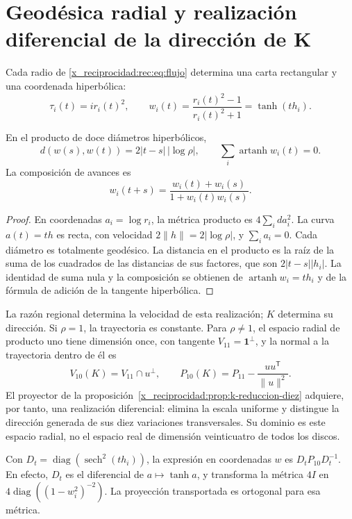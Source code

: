 \section{Geodésica radial y realización diferencial de la dirección de K}

Cada radio de \eqref{x_reciprocidad:rec:eq:flujo} determina una carta rectangular y una coordenada hiperbólica:
\[
 \tau_i(t)=ir_i(t)^2,\qquad
 w_i(t)=\frac{r_i(t)^2-1}{r_i(t)^2+1}=\tanh(th_i).
\]

\begin{theorem}
\label{x_reciprocidad:rec:thm:geodesica}
En el producto de doce diámetros hiperbólicos,
\begin{equation}
 d(w(s),w(t))=2|t-s|\,|\log\rho|,\qquad
 \sum_i\operatorname{artanh}w_i(t)=0.
 \label{x_reciprocidad:rec:eq:geodesica}
\end{equation}
La composición de avances es
\[
 w_i(t+s)=\frac{w_i(t)+w_i(s)}{1+w_i(t)w_i(s)}.
\]
\end{theorem}
\begin{proof}
En coordenadas \(a_i=\log r_i\), la métrica producto es \(4\sum_i da_i^2\). La curva \(a(t)=th\) es recta, con velocidad \(2\|h\|=2|\log\rho|\), y \(\sum_i a_i=0\). Cada diámetro es totalmente geodésico. La distancia en el producto es la raíz de la suma de los cuadrados de las distancias de sus factores, que son \(2|t-s||h_i|\). La identidad de suma nula y la composición se obtienen de \(\operatorname{artanh}w_i=th_i\) y de la fórmula de adición de la tangente hiperbólica.
\end{proof}

La razón regional determina la velocidad de esta realización; \(K\) determina su dirección. Si \(\rho=1\), la trayectoria es constante. Para \(\rho\ne1\), el espacio radial de producto uno tiene dimensión once, con tangente \(V_{11}=\mathbf1^\perp\), y la normal a la trayectoria dentro de él es
\[
 V_{10}(K)=V_{11}\cap u^\perp,\qquad
 P_{10}(K)=P_{11}-\frac{uu^{\mathsf T}}{\|u\|^2}.
\]
El proyector de la proposición~\ref{x_reciprocidad:prop:k-reduccion-diez} adquiere, por tanto, una realización diferencial: elimina la escala uniforme y distingue la dirección generada de sus diez variaciones transversales. Su dominio es este espacio radial, no el espacio real de dimensión veinticuatro de todos los discos.

Con \(D_t=\operatorname{diag}(\operatorname{sech}^2(th_i))\), la expresión en coordenadas \(w\) es \(D_tP_{10}D_t^{-1}\). En efecto, \(D_t\) es el diferencial de \(a\mapsto\tanh a\), y transforma la métrica \(4I\) en \(4\operatorname{diag}((1-w_i^2)^{-2})\). La proyección transportada es ortogonal para esa métrica.

